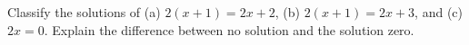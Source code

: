 Classify the solutions of (a) $2(x+1)=2x+2$, (b) $2(x+1)=2x+3$, and (c) $2x=0$. Explain the difference between no solution and the solution zero.
